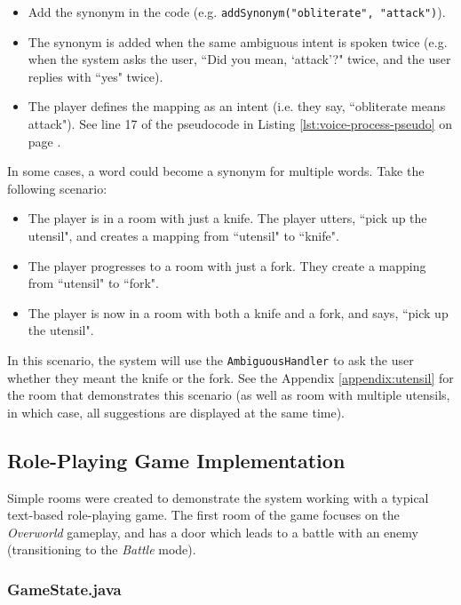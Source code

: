 \documentclass[11pt]{article}
\begin{document}
\begin{itemize}
\item Add the synonym in the code (e.g. \texttt{addSynonym("obliterate", "attack")}).

\item The synonym is added when the same ambiguous intent is spoken twice (e.g. when the system asks the user, ``Did you mean, `attack'?" twice, and the user replies with ``yes" twice).

\item The player defines the mapping as an intent (i.e. they say, ``obliterate means attack"). See line 17 of the pseudocode in Listing \ref{lst:voice-process-pseudo} on page \pageref{lst:voice-process-pseudo}.
\end{itemize}

In some cases, a word could become a synonym for multiple words. Take the following scenario:

\begin{itemize}
\item The player is in a room with just a knife. The player utters, ``pick up the utensil", and creates a mapping from ``utensil" to ``knife".

\item The player progresses to a room with just a fork. They create a mapping from ``utensil" to ``fork".

\item The player is now in a room with both a knife and a fork, and says, ``pick up the utensil".
\end{itemize}

In this scenario, the system will use the \texttt{AmbiguousHandler} to ask the user whether they meant the knife or the fork. See the Appendix \ref{appendix:utensil} for the room that demonstrates this scenario (as well as room with multiple utensils, in which case, all suggestions are displayed at the same time).

\subsection{Role-Playing Game Implementation}

Simple rooms were created to demonstrate the system working with a typical text-based role-playing game. The first room of the game focuses on the \textit{Overworld} gameplay, and has a door which leads to a battle with an enemy (transitioning to the \textit{Battle} mode).

\subsubsection{GameState.java}
\end{document}
